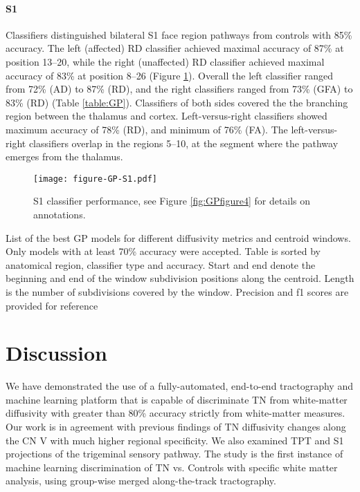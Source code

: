 \paragraph{S1}
Classifiers distinguished bilateral S1 face region pathways from controls with 85\% accuracy. The left (affected) RD classifier achieved maximal accuracy of 87\% at position 13--20, while the right (unaffected) RD classifier achieved maximal accuracy of 83\% at position 8--26 (Figure \ref{fig:GPfigure5}). Overall the left classifier ranged from 72\% (AD) to 87\% (RD), and the right classifiers ranged from 73\% (GFA) to 83\% (RD) (Table \ref{table:GP}). Classifiers of both sides covered the the branching region between the thalamus and cortex. Left-versus-right classifiers showed maximum accuracy of 78\% (RD), and minimum of 76\% (FA). The left-versus-right classifiers overlap in the regions 5--10, at the segment where the pathway emerges from the thalamus.

\begin{figure}[ht]
\centering
\texttt{[image: figure-GP-S1.pdf]}
\caption{S1 classifier performance, see Figure \ref{fig:GPfigure4} for details on annotations.}
\label{fig:GPfigure5}
\end{figure}

\begin{table}[ht]
\centering
{}
\caption{List of the best GP models for different diffusivity metrics and centroid windows. Only models with at least 70\% accuracy were accepted. Table is sorted by anatomical region, classifier type and accuracy. Start and end denote the beginning and end of the window subdivision positions along the centroid. Length is the number of subdivisions covered by the window. Precision and f1 scores are provided for reference}
\label{table:GP}
\end{table}

\section{Discussion}
We have demonstrated the use of a fully-automated, end-to-end tractography and machine learning platform that is capable of discriminate TN from white-matter diffusivity with greater than 80\% accuracy strictly from white-matter measures. Our work is in agreement with previous findings of TN diffusivity changes along the CN V with much higher regional specificity. We also examined TPT and S1 projections of the trigeminal sensory pathway. The study is the first instance of machine learning discrimination of TN vs. Controls with specific white matter analysis, using group-wise merged along-the-track tractography. 

